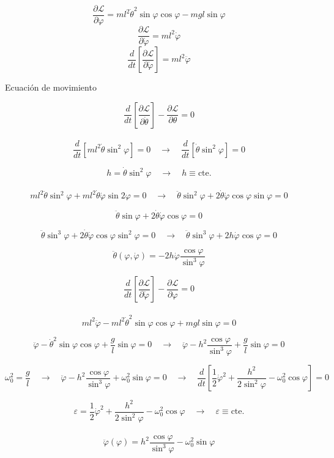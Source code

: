 \documentclass[10pt,a4papper]{article}
\begin{document}
\[\frac{\partial\mathcal{L}}{\partial\varphi}=ml^2\dot\theta^2\sin\varphi\cos\varphi-mgl\sin\varphi\]
\[\frac{\partial\mathcal{L}}{\partial\dot\varphi}=ml^2\dot\varphi\]
\[\frac{d}{dt}\left[\frac{\partial\mathcal{L}}{\partial\dot\varphi}\right]=ml^2\ddot\varphi\]

\newpage
Ecuación de movimiento

\[\frac{d}{dt}\left[\frac{\partial\mathcal{L}}{\partial\dot\theta}\right]-\frac{\partial\mathcal{L}}{\partial\theta}=0\]\\

\[\frac{d}{dt}\left[ml^2\dot\theta\sin^2\varphi\right]=0\quad\to\quad\frac{d}{dt}\left[\dot\theta\sin^2\varphi\right]=0\]

\[\boxed{h=\dot\theta\sin^2\varphi\quad\to\quad h\equiv\text{cte.}}\]\\

\[ml^2\ddot\theta\sin^2\varphi+ml^2\dot\theta\dot\varphi\sin2\varphi=0\quad\to\quad\ddot\theta\sin^2\varphi+2\dot\theta\dot\varphi\cos\varphi\sin\varphi=0\]

\[\boxed{\ddot\theta\sin\varphi+2\dot\theta\dot\varphi\cos\varphi=0}\]

\[\ddot\theta\sin^3\varphi+2\dot\theta\dot\varphi\cos\varphi\sin^2\varphi=0\quad\to\quad\ddot\theta\sin^3\varphi+2h\dot\varphi\cos\varphi=0\]

\[\boxed{\ddot\theta(\varphi,\dot\varphi)=-2h\dot\varphi\frac{\cos\varphi}{\sin^3\varphi}}\]

\newpage
\[\frac{d}{dt}\left[\frac{\partial\mathcal{L}}{\partial\dot\varphi}\right]-\frac{\partial\mathcal{L}}{\partial\varphi}=0\]\\

\[ml^2\ddot\varphi-ml^2\dot\theta^2\sin\varphi\cos\varphi+mgl\sin\varphi=0\]

\[\ddot\varphi-\dot\theta^2\sin\varphi\cos\varphi+\frac{g}{l}\sin\varphi=0\quad\to\quad
\ddot\varphi-h^2\frac{\cos\varphi}{\sin^3\varphi}+\frac{g}{l}\sin\varphi=0\]

\[\omega_0^2=\frac{g}{l}\quad\to\quad\ddot\varphi-h^2\frac{\cos\varphi}{\sin^3\varphi}+\omega_0^2\sin\varphi=0\quad\to\quad
\frac{d}{dt}\left[\frac{1}{2}\dot\varphi^2+\frac{h^2}{2\sin^2\varphi}-\omega_0^2\cos\varphi\right]=0\]

\[\boxed{\varepsilon=\frac{1}{2}\dot\varphi^2+\frac{h^2}{2\sin^2\varphi}-\omega_0^2\cos\varphi\quad\to\quad\varepsilon\equiv\text{cte.}}\]\\

\[\boxed{\ddot\varphi(\varphi)=h^2\frac{\cos\varphi}{\sin^3\varphi}-\omega_0^2\sin\varphi}\]
\end{document}
